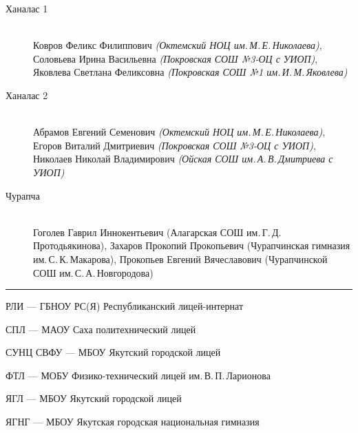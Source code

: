 \begin{description}
\item[Ханалас 1] ~ \\
Ковров Феликс Филиппович \textit{(Октемский НОЦ им.\,М.\,Е.\,Николаева)}, \\
Соловьева Ирина Васильевна \textit{(Покровская СОШ №3-ОЦ с УИОП)}, \\
Яковлева Светлана Феликсовна \textit{(Покровская СОШ №1 им.\,И.\,М.\,Яковлева)}

\item[Ханалас 2] ~ \\
Абрамов Евгений Семенович \textit{(Октемский НОЦ им.\,М.\,Е.\,Николаева)}, \\
Егоров Виталий Дмитриевич \textit{(Покровская СОШ №3-ОЦ с УИОП)}, \\
Николаев Николай Владимирович \textit{(Ойская СОШ им.\,А.\,В.\,Дмитриева с УИОП)}

\item[Чурапча] ~ \\
Гоголев Гаврил Иннокентьевич (Алагарская СОШ им.\,Г.\,Д.\,Протодьякинова),
Захаров Прокопий Прокопьевич (Чурапчинская гимназия им.\,С.\,К.\,Макарова),
Прокопьев Евгений Вячеславович (Чурапчинской СОШ им.\,С.\,А.\,Новгородова)

\end{description}

\noindent\rule{3cm}{0.4pt}

\noindent РЛИ --- ГБНОУ РС(Я) Республиканский лицей-интернат

\noindent СПЛ --- МАОУ Саха политехнический лицей

\noindent СУНЦ СВФУ --- МБОУ Якутский городской лицей

\noindent ФТЛ --- МОБУ Физико-технический лицей им.\,В.\,П.\,Ларионова

\noindent ЯГЛ --- МБОУ Якутский городской лицей

\noindent ЯГНГ --- МБОУ Якутская городская национальная гимназия
